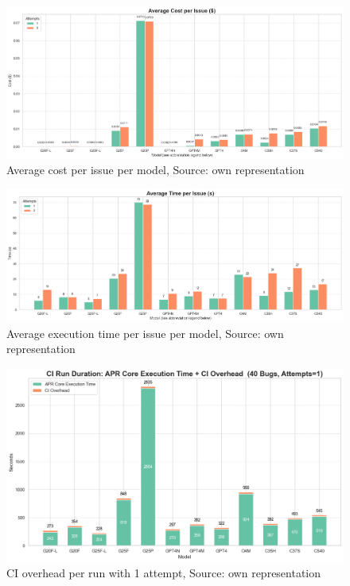 \begin{figure}[H]
    \centering
    \includegraphics[width=1\textwidth]{images/diagrams/avg_cost_per_issue_per_model_grouped.png}
    \caption{Average cost per issue per model, Source: own representation}
    \label{fig:avg-cost-per-issue}
\end{figure}

\begin{figure}[H]
    \centering
    \includegraphics[width=1\textwidth]{images/diagrams/avg_execution_time_per_issue_per_model_grouped.png}
    \caption{Average execution time per issue per model, Source: own representation}
    \label{fig:avg-execution-time-per-issue}
\end{figure}

\begin{figure}[H]
    \centering
    \includegraphics[width=1\textwidth]{images/diagrams/ci_vs_exec_time_per_run_stacked_attempts_1.png}
    \caption{CI overhead per run with 1 attempt, Source: own representation}
    \label{fig:ci-vs-exec-time-per-run-attempts-1}
\end{figure}

